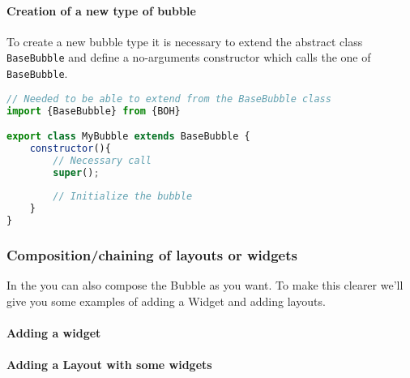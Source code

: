 \paragraph{Creation of a new type of bubble}
To create a new bubble type it is necessary to extend the abstract class \texttt{BaseBubble} and define a no-arguments constructor which calls the one of \texttt{BaseBubble}. \\
\begin{lstlisting}[language=JavaScript, frame=single]
// Needed to be able to extend from the BaseBubble class
import {BaseBubble} from {BOH}

export class MyBubble extends BaseBubble {
    constructor(){
        // Necessary call
        super();
        
        // Initialize the bubble
    }
}
\end{lstlisting}




\subsubsection{Composition/chaining of layouts or widgets}

In the  you can also compose the Bubble as you want. To make this clearer we'll give you some examples of adding a Widget and adding layouts.

\paragraph{Adding a widget}


\paragraph{Adding a Layout with some widgets}

